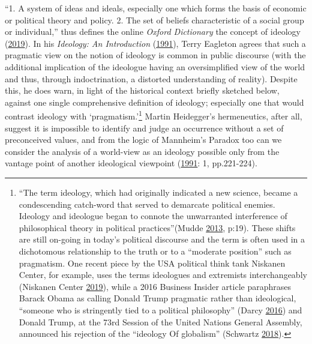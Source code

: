 \documentclass[10pt,british,A4paper,twoside]{memoir}
\begin{document}
``1. A system of ideas and ideals, especially one which forms the basis
of economic or political theory and policy. 2. The set of beliefs
characteristic of a social group or individual,'' thus defines the
online \emph{Oxford Dictionary} the concept of ideology
(\protect\hyperlink{ref-oxforddictionaries.com_ideology_2019}{2019}). In
his \emph{Ideology: An Introduction}
(\protect\hyperlink{ref-eagleton_ideology:_1991}{1991}), Terry Eagleton
agrees that such a pragmatic view on the notion of ideology is common in
public discourse (with the additional implication of the ideologue
having an oversimplified view of the world and thus, through
indoctrination, a distorted understanding of reality). Despite this, he
does warn, in light of the historical context briefly sketched below,
against one single comprehensive definition of ideology; especially one
that would contrast ideology with `pragmatism.'\footnote{``The term
  ideology, which had originally indicated a new science, became a
  condescending catch-word that served to demarcate political enemies.
  Ideology and ideologue began to connote the unwarranted interference
  of philosophical theory in political practices''(Mudde
  \protect\hyperlink{ref-mudde_oxford_2013}{2013}, p:19). These shifts
  are still on-going in today's political discourse and the term is
  often used in a dichotomous relationship to the truth or to a
  ``moderate position'' such as pragmatism. One recent piece by the USA
  political think tank Niskanen Center, for example, uses the terms
  ideologues and extremists interchangeably (Niskanen Center
  \protect\hyperlink{ref-niskanen_center_if_2019}{2019}), while a 2016
  Business Insider article paraphrases Barack Obama as calling Donald
  Trump pragmatic rather than ideological, ``someone who is stringently
  tied to a political philosophy'' (Darcy
  \protect\hyperlink{ref-darcy_obama_2016}{2016}) and Donald Trump, at
  the 73rd Session of the United Nations General Assembly, announced his
  rejection of the ``ideology Of globalism'' (Schwartz
  \protect\hyperlink{ref-schwartz_trump_2018}{2018}).} Martin
Heidegger's hermeneutics, after all, suggest it is impossible to
identify and judge an occurrence without a set of preconceived values,
and from the logic of Mannheim's Paradox too can we consider the
analysis of a world-view as an ideology possible only from the vantage
point of another ideological viewpoint
(\protect\hyperlink{ref-eagleton_ideology:_1991}{1991}: 1, pp.221-224).
\end{document}
